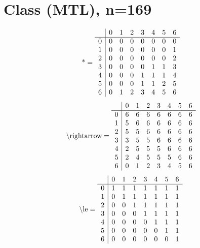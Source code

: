 \documentclass[11pt]{article}
\begin{document}
\section{Class (MTL), n=169}
\[\text{*} = 
\begin{array}{r | r r r r r r r}
 & 0 & 1 & 2 & 3 & 4 & 5 & 6 \\ \hline
0 & 0 & 0 & 0 & 0 & 0 & 0 & 0 \\
1 & 0 & 0 & 0 & 0 & 0 & 0 & 1 \\
2 & 0 & 0 & 0 & 0 & 0 & 0 & 2 \\
3 & 0 & 0 & 0 & 0 & 1 & 1 & 3 \\
4 & 0 & 0 & 0 & 1 & 1 & 1 & 4 \\
5 & 0 & 0 & 0 & 1 & 1 & 2 & 5 \\
6 & 0 & 1 & 2 & 3 & 4 & 5 & 6 \\
\end{array}
\]
\[\text{\textbackslash rightarrow} = 
\begin{array}{r | r r r r r r r}
 & 0 & 1 & 2 & 3 & 4 & 5 & 6 \\ \hline
0 & 6 & 6 & 6 & 6 & 6 & 6 & 6 \\
1 & 5 & 6 & 6 & 6 & 6 & 6 & 6 \\
2 & 5 & 5 & 6 & 6 & 6 & 6 & 6 \\
3 & 3 & 5 & 5 & 6 & 6 & 6 & 6 \\
4 & 2 & 5 & 5 & 5 & 6 & 6 & 6 \\
5 & 2 & 4 & 5 & 5 & 5 & 6 & 6 \\
6 & 0 & 1 & 2 & 3 & 4 & 5 & 6 \\
\end{array}
\]
\[\text{\textbackslash le} = 
\begin{array}{r | r r r r r r r}
 & 0 & 1 & 2 & 3 & 4 & 5 & 6 \\ \hline
0 & 1 & 1 & 1 & 1 & 1 & 1 & 1 \\
1 & 0 & 1 & 1 & 1 & 1 & 1 & 1 \\
2 & 0 & 0 & 1 & 1 & 1 & 1 & 1 \\
3 & 0 & 0 & 0 & 1 & 1 & 1 & 1 \\
4 & 0 & 0 & 0 & 0 & 1 & 1 & 1 \\
5 & 0 & 0 & 0 & 0 & 0 & 1 & 1 \\
6 & 0 & 0 & 0 & 0 & 0 & 0 & 1 \\
\end{array}
\]
\end{document}

